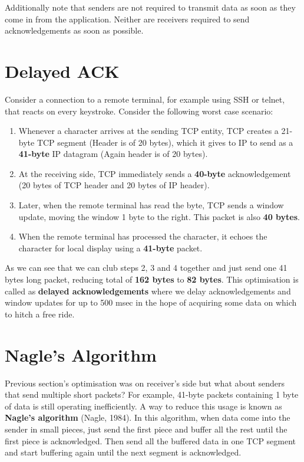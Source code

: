 \documentclass[twoside]{article}
\begin{document}
Additionally note that senders are not required to transmit data as soon as they come in from the application. Neither are receivers required to send
acknowledgements as soon as possible.

\section{Delayed ACK}

Consider a connection to a remote terminal, for example using SSH or telnet, that reacts on every keystroke. Consider the following worst case scenario: 
\begin{enumerate}
   \item Whenever a character arrives at the sending TCP entity, TCP creates a 21-byte TCP segment (Header is of 20 bytes), which it gives to IP to send as a \textbf{41-byte} IP datagram (Again header is of 20 bytes).
   \item At the receiving side, TCP immediately sends a \textbf{40-byte} acknowledgement (20 bytes of TCP header and 20 bytes of IP header).
   \item Later, when the remote terminal has read the byte, TCP sends a window update, moving the window 1 byte to the right. This packet is also \textbf{40 bytes}.
   \item When the remote terminal has processed the character, it echoes the character for local display using a \textbf{41-byte} packet.
\end{enumerate}

As we can see that we can club steps 2, 3 and 4 together and just send one 41 bytes long packet, reducing total of \textbf{162 bytes} to \textbf{82 bytes}. This optimisation is called as \textbf{delayed acknowledgements} where we delay acknowledgements and window updates for up to 500 msec in the hope of acquiring some data on which to hitch a free ride.

\section{Nagle's Algorithm}

Previous section's optimisation was on receiver's side but what about senders that send multiple short packets? For example, 41-byte packets containing 1 byte of data is still operating inefficiently. A way to reduce this usage is known as \textbf{Nagle’s algorithm} (Nagle, 1984). In this algorithm, when data come into the sender in small pieces, just send the first piece and buffer all the rest until the first piece is acknowledged. Then send all the buffered data in one TCP segment and start buffering again until the next segment is acknowledged.
\end{document}
